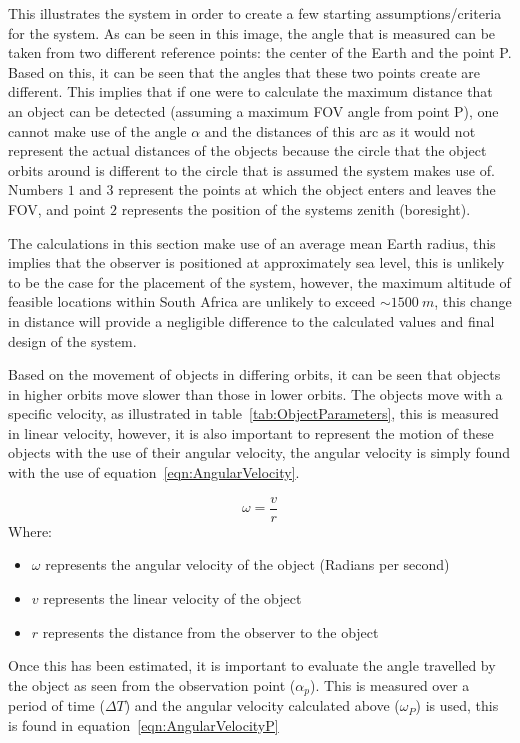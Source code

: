 \documentclass[11pt]{witseiepaper}
\begin{document}
\begin{bibunit}[witseie]
This illustrates the system in order to create a few starting assumptions/criteria for the system.
As can be seen in this image, the angle that is measured can be taken from two different reference points: the center of the Earth and the point P. Based on this, it can be seen that the angles that these two points create are different. This implies that if one were to calculate the maximum distance that an object can be detected (assuming a maximum FOV angle from point P), one cannot make use of the angle $\alpha$ and the distances of this arc as it would not represent the actual distances of the objects because the circle that the object orbits around is different to the circle that is assumed the system makes use of.
Numbers $1$ and $3$ represent the points at which the object enters and leaves the FOV, and point $2$ represents the position of the systems zenith (boresight).


The calculations in this section make use of an average mean Earth radius, this implies that the observer is positioned at approximately sea level, this is unlikely to be the case for the placement of the system, however, the maximum altitude of feasible locations within South Africa are unlikely to exceed $\sim 1500~m$, this change in distance will provide a negligible difference to the calculated values and final design of the system.


Based on the movement of objects in differing orbits, it can be seen that objects in higher orbits move slower than those in lower orbits.
The objects move with a specific velocity, as illustrated in table~\ref{tab:ObjectParameters}, this is measured in linear velocity, however, it is also important to represent the motion of these objects with the use of their angular velocity, the angular velocity is simply found with the use of equation~\ref{eqn:AngularVelocity}.

\begin{equation} \label{eqn:AngularVelocity}
\omega = \frac{v}{r}
\end{equation}
Where:
\begin{itemize}
    \item $\omega$ represents the angular velocity of the object (Radians per second)
    \item $v$ represents the linear velocity of the object
    \item $r$ represents the distance from the observer to the object
\end{itemize}

Once this has been estimated, it is important to evaluate the angle travelled by the object as seen from the observation point ($\alpha_{p}$). This is measured over a period of time ($\Delta T$) and the angular velocity calculated above ($\omega_{P}$) is used, this is found in equation~\ref{eqn:AngularVelocityP}


\end{bibunit}
\end{document}

